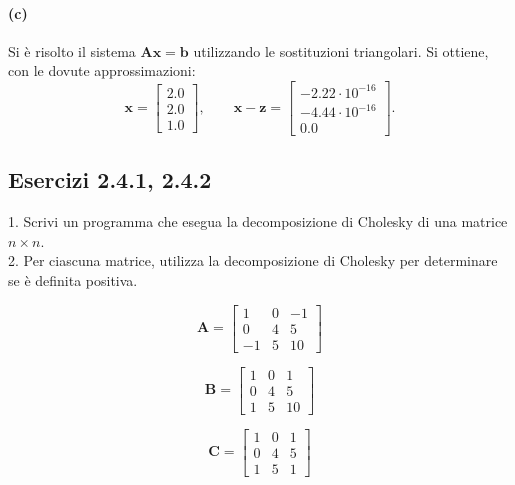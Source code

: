 \documentclass[letterpaper, 12pt]{article}
\numberwithin{equation}{section}    %
\begin{document}
\paragraph{(c)}Si è risolto il sistema $\mathbf{A}\mathbf{x} = \mathbf{b}$ utilizzando le sostituzioni triangolari.
Si ottiene, con le dovute approssimazioni:
\begin{equation*}
    \mathbf{x} = \begin{bmatrix}
        2.0 \\ 
        2.0 \\ 
        1.0
    \end{bmatrix},
    \qquad
    \mathbf{x} - \mathbf{z} = \begin{bmatrix}
        -2.22 \cdot 10^{-16}  \\
        -4.44 \cdot 10^{-16}  \\
        0.0
    \end{bmatrix}.
\end{equation*}

\subsection{Esercizi 2.4.1, 2.4.2}
1. Scrivi un programma che esegua la decomposizione di Cholesky di una matrice $n\times n$. \\
2. Per ciascuna matrice, utilizza la decomposizione di Cholesky per determinare se è definita positiva.

\begin{center}
    \begin{minipage}{0.32\textwidth}
    \centering
    \[
    \mathbf{A} =
    \begin{bmatrix}
    1 & 0 & -1 \\
    0 & 4 & 5 \\
    -1 & 5 & 10
    \end{bmatrix}
    \]
    \end{minipage}
    \hfill
    \begin{minipage}{0.32\textwidth}
    \centering
    \[
    \mathbf{B} =
    \begin{bmatrix}
    1 & 0 & 1 \\
    0 & 4 & 5 \\
    1 & 5 & 10
    \end{bmatrix}
    \]
    \end{minipage}
    \hfill
    \begin{minipage}{0.32\textwidth}
    \centering
    \[
    \mathbf{C} =
    \begin{bmatrix}
    1 & 0 & 1 \\
    0 & 4 & 5 \\
    1 & 5 & 1
    \end{bmatrix}
    \]
    \end{minipage}
\end{center}
\end{document}
